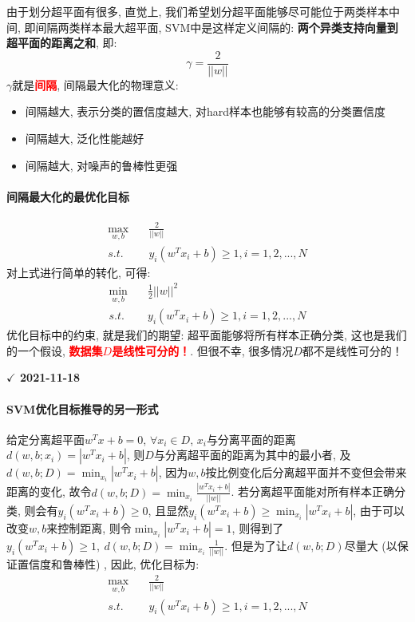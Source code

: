 由于划分超平面有很多, 直觉上, 我们希望划分超平面能够尽可能位于两类样本中间, 即间隔两类样本最大超平面, SVM中是这样定义间隔的: \textbf{两个异类支持向量到超平面的距离之和}, 即: 
$$
\gamma = \frac{2}{||w||}
$$
$\gamma$就是\textbf{\textcolor{red}{间隔}}, 间隔最大化的物理意义: 
\begin{itemize}
	\item 间隔越大, 表示分类的置信度越大, 对hard样本也能够有较高的分类置信度
	\item 间隔越大, 泛化性能越好
	\item 间隔越大, 对噪声的鲁棒性更强
\end{itemize}


\paragraph{间隔最大化的最优化目标}
\begin{align}
	\mathop{max}_{w, b}&\quad \frac{2}{||w||} \nonumber \\
	s.t.&\quad y_i(w^T x_i + b) \geqslant 1, i = 1, 2, ..., N \nonumber
\end{align}
对上式进行简单的转化, 可得: 
\begin{align}
	\mathop{min}_{w, b}&\quad \frac{1}{2}||w||^2 \nonumber \\
	s.t.&\quad y_i(w^T x_i + b) \geqslant 1, i = 1, 2, ..., N \nonumber
\end{align}
优化目标中的约束, 就是我们的期望: 超平面能够将所有样本正确分类, 这也是我们的一个假设, \textcolor{red}{\textbf{数据集$D$是线性可分的！}}. 但很不幸, 很多情况$D$都不是线性可分的！

\textbf{$\checkmark$ 2021-11-18}\\
\paragraph{SVM优化目标推导的另一形式}
给定分离超平面$w^T x + b = 0$, $\forall x_i \in D$, $x_i$与分离平面的距离$d(w, b; x_i) = |w^T x_i + b|$, 则$D$与分离超平面的距离为其中的最小者, 及$d(w, b; D) = \mathop{min}_{x_i} |w^T x_i +b|$, 因为$w, b$按比例变化后分离超平面并不变但会带来距离的变化, 故令$d(w, b; D) = \mathop{min}_{x_i} \frac{|w^T x_i + b|}{||w||}$. 若分离超平面能对所有样本正确分类, 则会有$y_i ( w^T x_i + b ) \geq 0$, 且显然$y_i ( w^T x_i + b ) \geq \mathop{min}_{x_i} |w^T x_i + b|$, 由于可以改变$w, b$来控制距离, 则令$\mathop{min}_{x_i} |w^T x_i + b| = 1$, 则得到了$y_i ( w^T x_i + b ) \geq 1,\ d(w, b; D) = \mathop{min}_{x_i} \frac{1}{||w||}$. 但是为了让$d(w, b; D)$尽量大 (以保证置信度和鲁棒性) , 因此, 优化目标为: 
\begin{align}
	\mathop{max}_{w, b}&\quad \frac{2}{||w||} \nonumber \\
	s.t.&\quad y_i(w^T x_i + b) \geqslant 1, i = 1, 2, ..., N \nonumber
\end{align}

